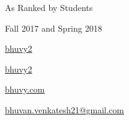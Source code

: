 \documentclass[11pt, a4paper]{awesome-cv}
\begin{document}
\makecvheader[C]
\vspace{-20pt}
\begin{minipage}[t]{0.75\textwidth}
\raggedright



\end{minipage}\quad
\begin{minipage}[t]{0.2\textwidth}
\raggedright




\bigskip


As Ranked by Students

\medskip


Fall 2017 and Spring 2018


\bigskip
{
\Large
\href{https://github.com/bhuvy2}{\faGithubSquare\acvHeaderIconSep bhuvy2}

\medskip

\href{https://linkedin.com/in/bhuvy2}{\faLinkedinSquare\acvHeaderIconSep bhuvy2}

\medskip

\href{https://bhuvy.com}{\faHome\acvHeaderIconSep bhuvy.com}
}

\end{minipage}%

\makecvfooter
  {}
  {{\Large \href{mailto:bhuvan.venkatesh21@gmail.com}{\faEnvelope\acvHeaderIconSep bhuvan.venkatesh21@gmail.com}  } }
  {}


\end{document}
